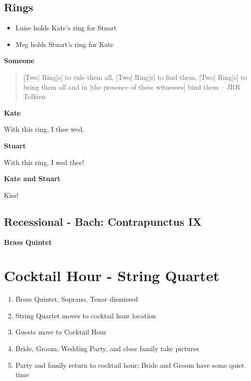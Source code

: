 \documentclass[twoside]{article}
\begin{document}
  	   \subsection{Rings}
         \begin{itemize}
           \item Luise holds Kate's ring for Stuart
           \item Meg holds Stuart's ring for Kate
         \end{itemize}
          
         \begin{center}
           \textbf{Someone}
         \end{center}
         \begin{quote}
  		     [Two] Ring[s] to rule them all, [Two] Ring[s] to find them,
  [Two] Ring[s] to bring them all and in [the presence of these witnesses] bind them
  	        -- JRR Tolkien
         \end{quote}

          \begin{center}
          \textbf{Kate}
          \end{center}
  		    With this ring, I thee wed.
          \begin{center}
          \textbf{Stuart}
          \end{center}
          With this ring, I wed thee!
          \begin{center}
          \textbf{Kate and Stuart}
          \end{center}
          Kiss!
          
  	   \subsection{Recessional - Bach: Contrapunctus IX}
         \begin{center}
           \textbf{Brass Quintet}
         \end{center}

  \section{Cocktail Hour - String Quartet}
    \begin{enumerate}
    	\item Brass Quintet, Soprano, Tenor dismissed
    	\item String Quartet moves to cocktail hour location
    	\item Guests move to Cocktail Hour
    	\item Bride, Groom, Wedding Party, and close family take pictures
    	\item Party and family return to cocktail hour; Bride and Groom have some quiet time
    \end{enumerate}
    
\end{document}
